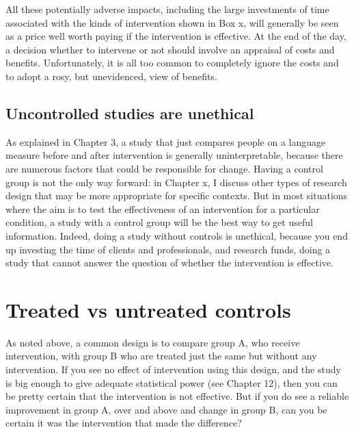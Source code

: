 \documentclass[]{book}
\begin{document}
All these potentially adverse impacts, including the large investments of time associated with the kinds of intervention shown in Box x, will generally be seen as a price well worth paying if the intervention is effective. At the end of the day, a decision whether to intervene or not should involve an appraisal of costs and benefits. Unfortunately, it is all too common to completely ignore the costs and to adopt a rosy, but unevidenced, view of benefits.

\hypertarget{uncontrolled-studies-are-unethical}{%
\subsection{Uncontrolled studies are unethical}\label{uncontrolled-studies-are-unethical}}

As explained in Chapter 3, a study that just compares people on a language measure before and after intervention is generally uninterpretable, because there are numerous factors that could be responsible for change. Having a control group is not the only way forward: in Chapter x, I discuss other types of research design that may be more appropriate for specific contexts. But in most situations where the aim is to test the effectiveness of an intervention for a particular condition, a study with a control group will be the best way to get useful information. Indeed, doing a study without controls is unethical, because you end up investing the time of clients and professionals, and research funds, doing a study that cannot answer the question of whether the intervention is effective.

\hypertarget{treated-vs-untreated-controls}{%
\section{Treated vs untreated controls}\label{treated-vs-untreated-controls}}

As noted above, a common design is to compare group A, who receive intervention, with group B who are treated just the same but without any intervention. If you see no effect of intervention using this design, and the study is big enough to give adequate statistical power (see Chapter 12), then you can be pretty certain that the intervention is not effective. But if you do see a reliable improvement in group A, over and above and change in group B, can you be certain it was the intervention that made the difference?
\end{document}
